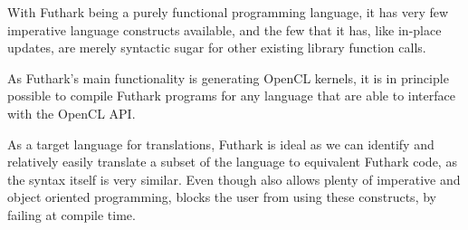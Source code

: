 With Futhark being a purely functional programming language, it has very few
imperative language constructs available, and the few that it has, like
in-place updates, are merely syntactic sugar for other existing library function calls.

As Futhark's main functionality is generating OpenCL kernels, it is in principle
possible to compile Futhark programs for any language that are able to interface
with the OpenCL API.

As a target language for \fsharp{} translations,
Futhark is ideal as we can identify and relatively easily translate a subset
of the \fsharp{} language to equivalent Futhark code, as the syntax itself is
very similar. Even though \fsharp{} also allows plenty of imperative and object
oriented programming,
\fshark{} blocks the user from using these constructs, by failing at \fshark{}
compile time.


\section{\csharp{}}
\csharp{} 
\csharp{} 
\csharp{} 
\csharp{} 




